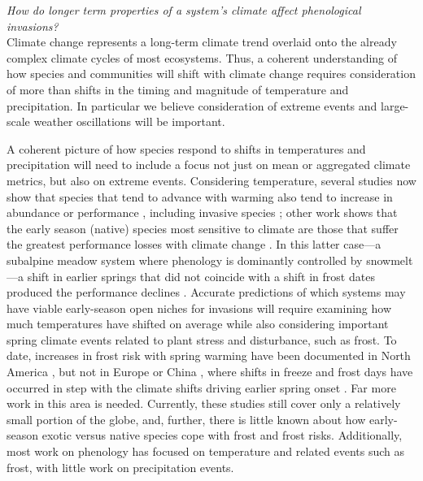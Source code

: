 \documentclass[11pt,a4paper,oneside]{article}
\begin{document}
\noindent \emph{How do longer term properties of a system's climate affect phenological invasions?} \\
\noindent  Climate change represents a long-term climate trend overlaid onto the already complex climate cycles of most ecosystems. Thus, a coherent understanding of how species and communities will shift with climate change requires consideration of more than shifts in the timing and magnitude of temperature and precipitation. In particular we believe consideration of extreme events and large-scale weather oscillations will be important.

A coherent picture of how species respond to shifts in temperatures and precipitation will need to include a focus not just on mean or aggregated climate metrics, but also on extreme events. Considering temperature, several studies now show that species that tend to advance with warming also tend to increase in abundance or performance \citep{Cleland:2012vn}, including invasive species \citep{Willis:2010al,chuine2013}; other work shows that the early season (native) species most sensitive  to climate are those that suffer the greatest performance losses with climate change \citep{Inouye:2008gj}. In this latter case---a subalpine meadow system where phenology is dominantly controlled by snowmelt---a shift in earlier springs that did not coincide with a shift in frost dates produced the performance declines \citep{Inouye:2008gj}. Accurate predictions of which systems may have viable early-season open niches for invasions will require examining how much temperatures have shifted on average while also considering important spring climate events related to plant stress and disturbance, such as frost. To date, increases in frost risk with spring warming have been documented in North America \citep{Inouye:2008gj,gu2008,Augspurger2013}, but not in Europe \citep{Menzel2003a,Scheifinger2003} or China \citep{Dai2013}, where shifts in freeze and frost days have occurred in step with the climate shifts driving earlier spring onset \citep{Dai2013}. Far more work in this area is needed. Currently, these studies still cover only a relatively small portion of the globe, and, further, there is little known about how early-season exotic versus native species cope with frost and frost risks. Additionally, most work on phenology has focused on temperature and related events such as frost, with little work on precipitation events.
\end{document}
